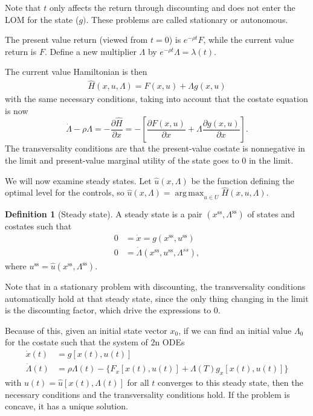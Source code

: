 \documentclass{tufte-handout}
\DeclareMathOperator*{\argmax}{arg\,max} %
\theoremstyle{definition}
\newtheorem{defn}[thm]{Definition}
\begin{document}
Note that $t$ only affects the return through discounting and does not enter the LOM for the state ($g)$. These problems are called stationary or autonomous.

The present value return (viewed from $t=0$) is $e^{-\rho t}F $, while the current value return is $F$. Define a new multiplier $\Lambda$ by $e^{-\rho t}\Lambda = \lambda(t)$.

The current value Hamiltonian is then
\begin{align*}
	\hat{H}(x,u,\Lambda) = F(x,u) + \Lambda g(x,u)
\end{align*}
with the same necessary conditions, taking into account that the costate equation is now \[
	\dot{\Lambda} - \rho\Lambda = -\frac{\partial \hat{H}}{\partial x} = -\left[ \frac{\partial F(x,u)}{\partial x}  + \Lambda \frac{\partial g(x,u)}{\partial x}  \right] 
.\] The transversality conditions are that the present-value costate is nonnegative in the limit and present-value marginal utility of the state goes to $0$ in the limit.

We will now examine steady states. Let $\hat{u}(x,\Lambda)$ be the function defining the optimal level for the controls, so $\hat{u}(x,\Lambda) = \argmax_{u \in U} \hat{H}(x,u,\Lambda)$.
\begin{defn}[Steady state]
	A steady state is a pair $(x^{\text{ss}}, \Lambda^{\text{ss}})$ of states and costates such that
	\begin{align*}
		0 &= \dot{x} = g(x^{\text{ss}}, u^{\text{ss}}) \\
		0 &= \dot{\Lambda}(x^{\text{ss}}, u^{\text{ss}}, \Lambda^{ss})
	,\end{align*}
	where $u^{\text{ss}} = \hat{u}\left( x^{\text{ss}},\Lambda^{\text{ss}} \right)$.
\end{defn}
Note that in a stationary problem with discounting, the transversality conditions automatically hold at that steady state, since the only thing changing in the limit is the discounting factor, which drive the expressions to $0$.

Because of this, given an initial state vector $x_0$, if we can find an initial value $\Lambda_0$ for the costate such that the system of $2$n ODEs 
\begin{align*}
	\dot{x}(t) &=  g[x(t), u(t)] \\
	\dot{\Lambda}(t) &= \rho \Lambda(t) - \{F_x\left[ x(t),u(t) \right] + \Lambda(T) g_x \left[ x(t), u(t) \right] \}
\end{align*}
with $u(t) = \hat{u}\left[ x(t), \Lambda(t) \right]$ for all $t$ converges to this steady state, then  the necessary conditions and the transversality conditions hold. If the problem is concave, it has a unique solution.
\end{document}
